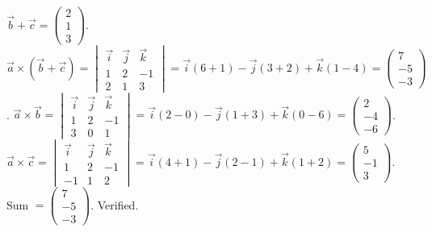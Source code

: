 \documentclass[11pt]{article}
\begin{document}
\begin{corrige}[Exercise 1]
$\vec{b}+\vec{c} = \begin{pmatrix}2\\1\\3\end{pmatrix}$.
$\vec{a}\times(\vec{b}+\vec{c}) = \begin{vmatrix}\vec{i}&\vec{j}&\vec{k}\\1&2&-1\\2&1&3\end{vmatrix} = \vec{i}(6+1) - \vec{j}(3+2) + \vec{k}(1-4) = \begin{pmatrix}7\\-5\\-3\end{pmatrix}$.
$\vec{a}\times\vec{b} = \begin{vmatrix}\vec{i}&\vec{j}&\vec{k}\\1&2&-1\\3&0&1\end{vmatrix} = \vec{i}(2-0) - \vec{j}(1+3) + \vec{k}(0-6) = \begin{pmatrix}2\\-4\\-6\end{pmatrix}$.
$\vec{a}\times\vec{c} = \begin{vmatrix}\vec{i}&\vec{j}&\vec{k}\\1&2&-1\\-1&1&2\end{vmatrix} = \vec{i}(4+1) - \vec{j}(2-1) + \vec{k}(1+2) = \begin{pmatrix}5\\-1\\3\end{pmatrix}$.
Sum $= \begin{pmatrix}7\\-5\\-3\end{pmatrix}$. Verified.
\end{corrige}
\end{document}

